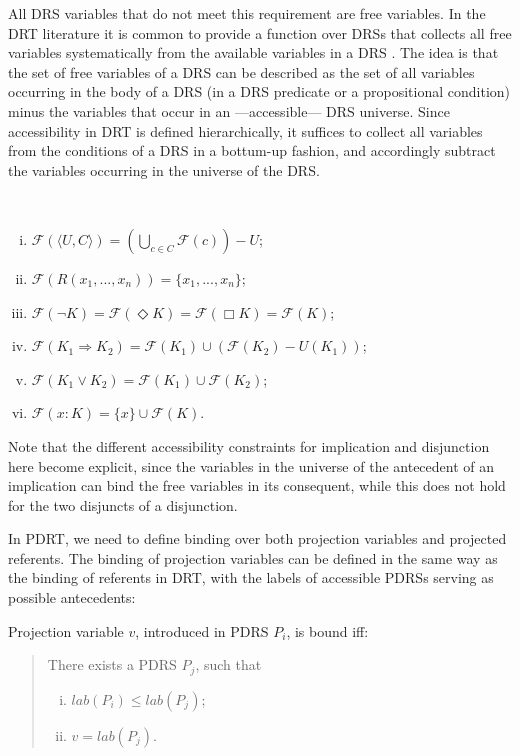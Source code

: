 \noindent All DRS variables that do not meet this requirement are free
variables. In the DRT literature it is common to provide a function over
DRSs that collects all free variables systematically from the available
variables in a DRS
. The idea is that the set of free variables of a DRS can be described
as the set of all variables occurring in the body of a DRS (in a DRS
predicate or a propositional condition) minus the variables that occur in an
---accessible--- DRS universe. Since accessibility in DRT is defined
hierarchically, it suffices to collect all variables from the conditions of
a DRS in a bottum-up fashion, and accordingly subtract the variables
occurring in the universe of the DRS.

\begin{definition}~\label{def:fdrsvs} 
  \begin{enumerate}[i.]
    \item $\mathcal{F}(\langle U, C \rangle)
          = (\bigcup_{c\in C} \mathcal{F}(c)) - U$;
    \item $\mathcal{F}(R(x_1,...,x_n)) = \{x_1,...,x_n\}$;
    \item $\mathcal{F}(\neg K) 
          = \mathcal{F}(\Diamond K) 
          = \mathcal{F}(\Box K)
          = \mathcal{F}(K)$;
    \item $\mathcal{F}(K_1 \Rightarrow K_2)
          = \mathcal{F}(K_1) \cup (\mathcal{F}(K_2) - U(K_1))$;
    \item $\mathcal{F}(K_1 \vee K_2)
          = \mathcal{F}(K_1) \cup \mathcal{F}(K_2)$;
    \item $\mathcal{F}(x:K) = \{x\} \cup \mathcal{F}(K)$.
  \end{enumerate}
\end{definition}

\noindent Note that the different accessibility constraints for implication
and disjunction here become explicit, since the variables in the universe of
the antecedent of an implication can bind the free variables in its
consequent, while this does not hold for the two disjuncts of a disjunction.

In PDRT, we need to define binding over both projection variables and
projected referents. The binding of projection variables can be defined in
the same way as the binding of referents in DRT, with the labels of
accessible PDRSs serving as possible antecedents:

\begin{definition}
Projection variable $v$, introduced in PDRS $P_i$, is bound iff:
\begin{quote}
There exists a PDRS $P_j$, such that
\begin{enumerate}[i.]
  \item $lab(P_i) \leq lab(P_j)$; 
  \item $v = lab(P_j)$.
\end{enumerate}
\end{quote}
\end{definition}

